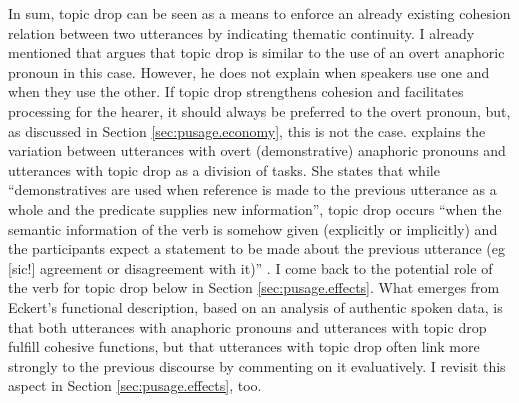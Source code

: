 In sum, topic drop can be seen as a means to enforce an already existing cohesion relation between two utterances by indicating thematic continuity.
I already mentioned that \citet{auer1993} argues that topic drop is similar to the use of an overt anaphoric pronoun in this case.
However, he does not explain when speakers use one and when they use the other.
If topic drop strengthens cohesion and facilitates processing  for the hearer, it should always be preferred to the overt pronoun, but, as discussed in Section \ref{sec:pusage.economy}, this is not the case.
\citet{eckert1998.diss} explains the variation between utterances with overt (demonstrative) anaphoric pronouns and utterances with topic drop as a division of tasks.
She states that while ``demonstratives are used when reference is made to the previous utterance as a whole and the predicate supplies new information'', topic drop occurs ``when the semantic information of the verb is somehow given  (explicitly or implicitly) and the participants expect a statement to be made about the previous utterance (eg [sic!] agreement or disagreement with it)'' \citep[217]{eckert1998.diss}.
I come back to the potential role of the verb for topic drop below in Section \ref{sec:pusage.effects}.
What emerges from Eckert's functional description, based on an analysis of authentic spoken data, is that both utterances with anaphoric pronouns and utterances with topic drop fulfill cohesive functions, but that utterances with topic drop often link more strongly to the previous discourse by commenting on it evaluatively.
I revisit this aspect in Section \ref{sec:pusage.effects}, too.

